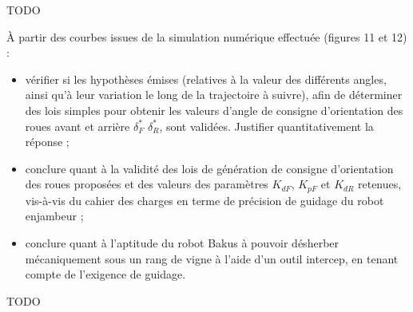 \documentclass[11pt]{article}
\begin{document}
\begin{UPSTIcorrige}
TODO
\end{UPSTIcorrige}



\UPSTIquestion  À partir des courbes issues de la simulation numérique effectuée (figures 11 et 12) :
\begin{itemize}
\item vérifier si les hypothèses émises (relatives à la valeur des différents angles, ainsi qu’à leur variation le long
de la trajectoire à suivre), afin de déterminer des lois simples pour obtenir les valeurs d’angle de consigne
d’orientation des roues avant et arrière $\delta_F^*$ $\delta_R^*$, sont validées. Justifier quantitativement la réponse ;
\item conclure quant à la validité des lois de génération de consigne d’orientation des roues proposées et des valeurs
des paramètres $K_{dF}$, $K_{pF}$ et $K_{dR}$ retenues, vis-à-vis du cahier des charges en terme de précision de guidage du robot enjambeur ;
\item conclure quant à l’aptitude du robot Bakus à pouvoir désherber mécaniquement sous un rang de vigne à
l’aide d’un outil intercep, en tenant compte de l’exigence de guidage.
\end{itemize}

\begin{UPSTIcorrige}
TODO
\end{UPSTIcorrige}




%
%
%
%
%
%
%
%
%
%
%
%
%
%
\end{document}
